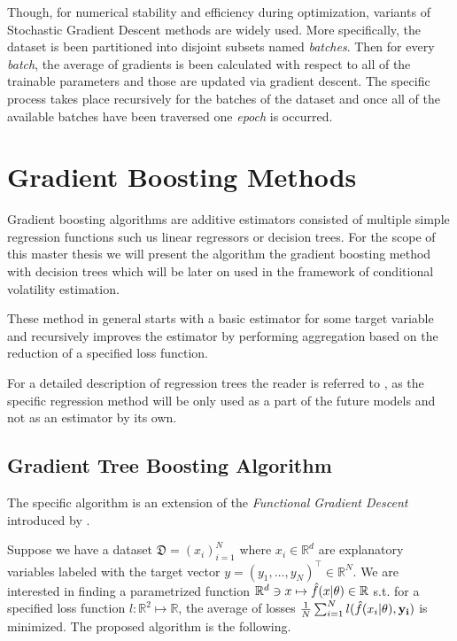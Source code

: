 \documentclass[a4paper, oneside]{discothesis}
\begin{document}
Though, for numerical stability and efficiency during optimization, variants of Stochastic Gradient Descent methods are widely used. More specifically, the dataset is been partitioned into disjoint subsets named \textit{batches}. Then for every \textit{batch}, the average of gradients is been calculated with respect to all of the trainable parameters and those are updated via gradient descent. The specific process takes place recursively for the batches of the dataset and once all of the available batches have been traversed one \textit{epoch} is occurred.
\section{Gradient Boosting Methods}

Gradient boosting algorithms are additive estimators consisted of multiple simple regression functions such us linear regressors or decision trees. For the scope of this master thesis we will present the algorithm the gradient boosting method with decision trees which will be later on used in the framework of conditional volatility estimation.

These method in general starts with a basic estimator for some target variable and recursively improves the estimator by performing aggregation based on the reduction of a specified loss function.

For a detailed description of regression trees the reader is referred to \cite{hastie01statisticallearning}, as the specific regression method will be only used as a part of the future models and not as an estimator by its own.

\subsection{Gradient Tree Boosting Algorithm}\label{GB}

The specific algorithm is an extension of the \textit{Functional Gradient Descent} introduced by \cite{FriedFGB}.

Suppose we have a dataset $\mathfrak{D} = \left(x_i\right)_{i=1}^N$ where $x_i\in \mathbb{R}^d$ are explanatory variables labeled with the target vector $y = \left(y_1, \dots, y_N\right)^\intercal\in \mathbb{R}^N$. We are interested in finding a parametrized function $\mathbb{R}^d \ni x \mapsto \hat{f}(x| \bf{\theta})\in \mathbb{R}$ s.t. for a specified loss function $l:\mathbb{R}^2\mapsto\mathbb{R}$, the average of losses $\frac{1}{N}\sum_{i=1}^{N}l(\hat{f}(x_i| \bf{\theta}), y_i)$ is minimized.
The proposed algorithm is the following.
\end{document}
